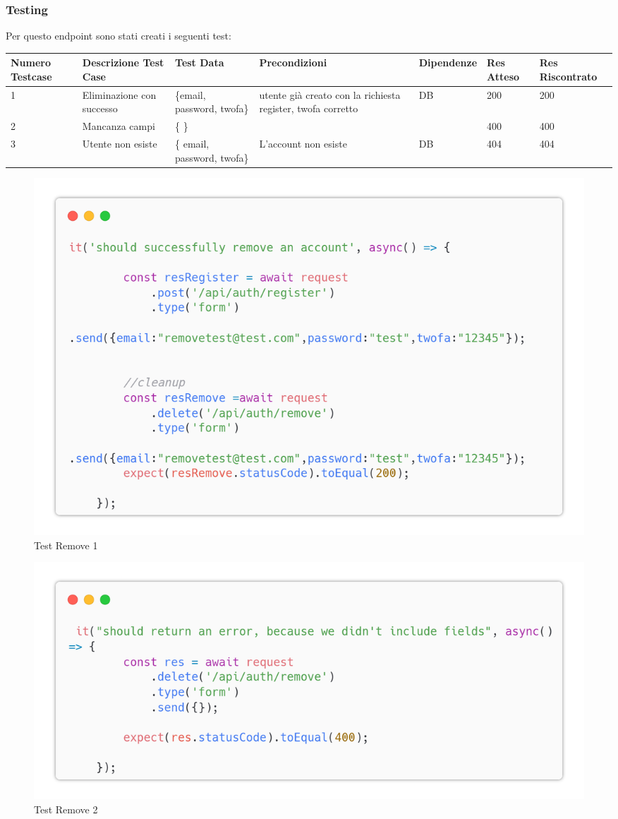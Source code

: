 \documentclass{report}
\begin{document}
\subsubsection*{Testing}
Per questo endpoint sono stati creati i seguenti test:
\begin{center} %
	\centering
	\begin{tabular}{ |p{1cm}|p{2cm}|p{2cm}|p{2cm}|p{2cm}|p{1cm}|p{1cm}| }
		\hline
		Numero Testcase & Descrizione Test Case     & Test Data                   & Precondizioni                                               & Dipendenze & Res Atteso & Res Riscontrato \\
		\hline
		1               & Eliminazione con successo & \{email, password, twofa\}  & utente già creato con la richiesta register, twofa corretto & DB         & 200        & 200             \\
		\hline
		2               & Mancanza campi            & \{ \}                       &                                                             &            & 400        & 400             \\
		\hline
		3               & Utente non esiste         & \{ email, password, twofa\} & L'account non esiste                                        & DB         & 404        & 404             \\
		\hline
	\end{tabular}
\end{center}
\begin{figure}[H]
	\centering\includegraphics[width=1\textwidth]{images/microservizio-autenticazione/tests/remove_test_1.png}
	\caption{Test Remove 1}
\end{figure}
\begin{figure}[H]
	\centering\includegraphics[width=1\textwidth]{images/microservizio-autenticazione/tests/remove_test_2.png}
	\caption{Test Remove 2}
\end{figure}
\end{document}
